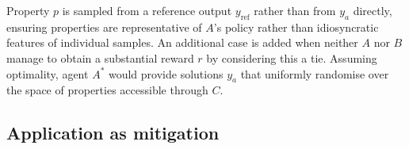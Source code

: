 Property $p$ is sampled from a reference output $y_\mathrm{ref}$ rather than from $y_a$ directly, ensuring properties are representative of $A$'s policy rather than idiosyncratic features of individual samples.
An additional case is added when neither $A$ nor $B$ manage to obtain a substantial reward $r$ by considering this a tie.
Assuming optimality, agent $A^*$ would provide solutions $y_a$ that uniformly randomise over the space of properties accessible through $C$.  


\subsection{Application as mitigation}

